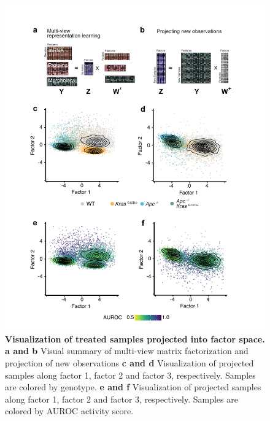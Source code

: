 \begin{flushleft}
\begin{figure}[h]
\centering
\includegraphics[scale=0.75,
                keepaspectratio]{figures/adenomaprofiling/pdf/fig_5_0.pdf}
\caption[Visualization of treated samples projected into factor space]{\textbf{Visualization of treated samples projected into factor space. a and b} Visual summary of multi-view matrix factorization and projection of new observations \textbf{c and d} Visualization of projected samples along factor 1, factor 2 and factor 3, respectively. Samples are colored by genotype. \textbf{e and f} Visualization of projected samples along factor 1, factor 2 and factor 3, respectively. Samples are colored by AUROC activity score.}
\label{fig_500}
\end{figure}
\bigbreak



\end{flushleft}
